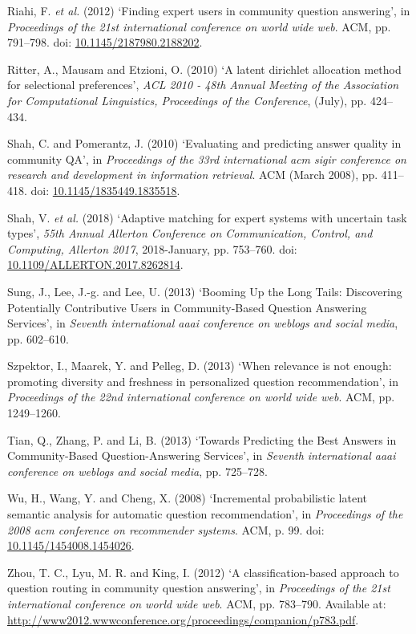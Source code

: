 \documentclass[11pt,preprint, authoryear]{article}
\numberwithin{equation}{section}
\begin{document}
\hypertarget{ref-Riahi2012}{}
Riahi, F. \emph{et al.} (2012) `Finding expert users in community
question answering', in \emph{Proceedings of the 21st international
conference on world wide web}. ACM, pp. 791--798. doi:
\href{https://doi.org/10.1145/2187980.2188202}{10.1145/2187980.2188202}.

\hypertarget{ref-Ritter2010}{}
Ritter, A., Mausam and Etzioni, O. (2010) `A latent dirichlet allocation
method for selectional preferences', \emph{ACL 2010 - 48th Annual
Meeting of the Association for Computational Linguistics, Proceedings of
the Conference}, (July), pp. 424--434.

\hypertarget{ref-Shah2010}{}
Shah, C. and Pomerantz, J. (2010) `Evaluating and predicting answer
quality in community QA', in \emph{Proceedings of the 33rd international
acm sigir conference on research and development in information
retrieval}. ACM (March 2008), pp. 411--418. doi:
\href{https://doi.org/10.1145/1835449.1835518}{10.1145/1835449.1835518}.

\hypertarget{ref-Shah2018}{}
Shah, V. \emph{et al.} (2018) `Adaptive matching for expert systems with
uncertain task types', \emph{55th Annual Allerton Conference on
Communication, Control, and Computing, Allerton 2017}, 2018-January, pp.
753--760. doi:
\href{https://doi.org/10.1109/ALLERTON.2017.8262814}{10.1109/ALLERTON.2017.8262814}.

\hypertarget{ref-Sung2013}{}
Sung, J., Lee, J.-g. and Lee, U. (2013) `Booming Up the Long Tails:
Discovering Potentially Contributive Users in Community-Based Question
Answering Services', in \emph{Seventh international aaai conference on
weblogs and social media}, pp. 602--610.

\hypertarget{ref-Szpektor2013}{}
Szpektor, I., Maarek, Y. and Pelleg, D. (2013) `When relevance is not
enough: promoting diversity and freshness in personalized question
recommendation', in \emph{Proceedings of the 22nd international
conference on world wide web}. ACM, pp. 1249--1260.

\hypertarget{ref-Tian2013}{}
Tian, Q., Zhang, P. and Li, B. (2013) `Towards Predicting the Best
Answers in Community-Based Question-Answering Services', in
\emph{Seventh international aaai conference on weblogs and social
media}, pp. 725--728.

\hypertarget{ref-Wu2008}{}
Wu, H., Wang, Y. and Cheng, X. (2008) `Incremental probabilistic latent
semantic analysis for automatic question recommendation', in
\emph{Proceedings of the 2008 acm conference on recommender systems}.
ACM, p. 99. doi:
\href{https://doi.org/10.1145/1454008.1454026}{10.1145/1454008.1454026}.

\hypertarget{ref-Zhou2012}{}
Zhou, T. C., Lyu, M. R. and King, I. (2012) `A classification-based
approach to question routing in community question answering', in
\emph{Proceedings of the 21st international conference on world wide
web}. ACM, pp. 783--790. Available at:
\url{http://www2012.wwwconference.org/proceedings/companion/p783.pdf}.

\newcommand\wordcount{
    \immediate\write18{texcount -sub=section \jobname.tex  | grep "Section" |     sed -e 's/+.*//' | sed -n \thesection p > 'count.txt'}
(words)}
\end{document}
